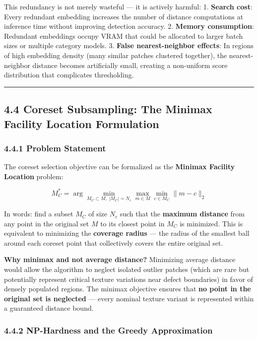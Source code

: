 This redundancy is not merely wasteful --- it is actively harmful: 1. \textbf{Search cost}: Every redundant embedding increases the number of distance computations at inference time without improving detection accuracy. 2. \textbf{Memory consumption}: Redundant embeddings occupy VRAM that could be allocated to larger batch sizes or multiple category models. 3. \textbf{False nearest-neighbor effects}: In regions of high embedding density (many similar patches clustered together), the nearest-neighbor distance becomes artificially small, creating a non-uniform score distribution that complicates thresholding.

\begin{center}\rule{0.5\linewidth}{0.5pt}\end{center}

\subsection{4.4 Coreset Subsampling: The Minimax Facility Location Formulation}\label{coreset-subsampling-the-minimax-facility-location-formulation}

\subsubsection{4.4.1 Problem Statement}\label{problem-statement}

The coreset selection objective can be formalized as the \textbf{Minimax Facility Location} problem:

\[M_C^* = \arg\min_{M_C \subset M, \; |M_C| = N_c} \max_{m \in M} \min_{c \in M_C} \|m - c\|_2\]

In words: find a subset \(M_C\) of size \(N_c\) such that the \textbf{maximum distance} from any point in the original set \(M\) to its closest point in \(M_C\) is minimized. This is equivalent to minimizing the \textbf{coverage radius} --- the radius of the smallest ball around each coreset point that collectively covers the entire original set.

\textbf{Why minimax and not average distance?} Minimizing average distance would allow the algorithm to neglect isolated outlier patches (which are rare but potentially represent critical texture variations near defect boundaries) in favor of densely populated regions. The minimax objective ensures that \textbf{no point in the original set is neglected} --- every nominal texture variant is represented within a guaranteed distance bound.

\subsubsection{4.4.2 NP-Hardness and the Greedy Approximation}\label{np-hardness-and-the-greedy-approximation}

